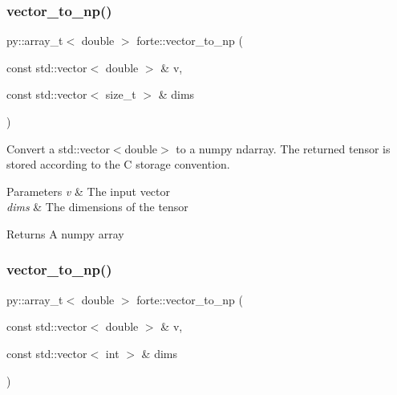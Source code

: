 \mbox{\label{namespaceforte_aeeb444d5365308c0d78dcaabd81b22ff}} 
\subsubsection{\texorpdfstring{vector\+\_\+to\+\_\+np()}{vector\_to\_np()}\hspace{0.1cm}{\footnotesize\ttfamily [1/2]}}
{\footnotesize\ttfamily py\+::array\+\_\+t$<$ double $>$ forte\+::vector\+\_\+to\+\_\+np (\begin{DoxyParamCaption}\item[{const std\+::vector$<$ double $>$ \&}]{v,  }\item[{const std\+::vector$<$ size\+\_\+t $>$ \&}]{dims }\end{DoxyParamCaption})}



Convert a std\+::vector$<$double$>$ to a numpy ndarray. The returned tensor is stored according to the C storage convention. 


\begin{DoxyParams}{Parameters}
{\em v} & The input vector \\
\hline
{\em dims} & The dimensions of the tensor \\
\hline
\end{DoxyParams}
\begin{DoxyReturn}{Returns}
A numpy array 
\end{DoxyReturn}
\mbox{\label{namespaceforte_a1ba1483f6f6e034a111381ea1b0e74ec}} 
\subsubsection{\texorpdfstring{vector\+\_\+to\+\_\+np()}{vector\_to\_np()}\hspace{0.1cm}{\footnotesize\ttfamily [2/2]}}
{\footnotesize\ttfamily py\+::array\+\_\+t$<$ double $>$ forte\+::vector\+\_\+to\+\_\+np (\begin{DoxyParamCaption}\item[{const std\+::vector$<$ double $>$ \&}]{v,  }\item[{const std\+::vector$<$ int $>$ \&}]{dims }\end{DoxyParamCaption})}


